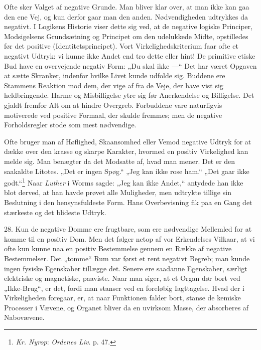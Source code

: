 \documentclass[12pt,a4paper]{book}
\newcommand{\apage}[1]{\marginnote{\footnotesize\textit{[#1]}}}
\begin{document}
Ofte sker Valget af negative Grunde. Man bliver klar over, at man ikke
kan gaa den ene Vej, og kun derfor gaar man den anden. Nødvendigheden
udtrykkes da negativt. I Logikens Historie viser dette sig ved, at de
negative logiske Principer, Modsigelsens Grundsætning og Principet om
den udelukkede Midte, opstilledes før det positive (Identitetsprincipet).
Vort Virkelighedskriterium faar ofte et negativt Udtryk: vi kunne ikke
Andet end tro dette eller hint! De primitive etiske Bud have en
overvejende negativ Form: „Du \apage{80} skal ikke ---“ Det har været Opgaven at
sætte Skranker, indenfor hvilke Livet kunde udfolde sig. Buddene ere
Stammens Reaktion mod dem, der vige af fra de Veje, der have vist sig
heldbringende. Harme og Misbilligelse ytre sig før Anerkendelse og
Billigelse. Det gjaldt fremfor Alt om at hindre Overgreb. Forbuddene
vare naturligvis motiverede ved positive Formaal, der skulde fremmes;
men de negative Forholdsregler stode som mest nødvendige.

Ofte bruger man af Høflighed, Skaansomhed eller Vemod negative Udtryk
for at dække over den krasse og skarpe Karakter, hvormed en positiv
Virkelighed kan melde sig. Man benægter da det Modsatte af, hvad man
mener. Det er den saakaldte Litotes. „Det er ingen Spøg.“ „Jeg kan ikke
rose ham.“ „Det gaar ikke godt.“\footnote{\emph{Kr. Nyrop}:
\emph{Ordenes Liv}. p. 47.} Naar \emph{Luther} i Worms sagde: „Jeg kan
ikke Andet,“ antydede han ikke blot derved, at han havde prøvet alle
Muligheder, men udtrykte tillige sin Beslutning i den hensynsfuldeste
Form. Hans Overbevisning fik paa en Gang det stærkeste og det blideste
Udtryk.

28. Kun de negative Domme ere frugtbare, som ere nødvendige Mellemled
for at komme til en positiv Dom. Men det følger netop af vor Erkendelses
Vilkaar, at vi ofte kun kunne naa en positiv Bestemmelse gennem en Række
af negative Bestemmelser. Det „tomme“ Rum var først et rent negativt
Begreb; man kunde ingen fysiske Egenskaber tillægge det. Senere ere
saadanne Egenskaber, særligt elektriske og magnetiske, paaviste. Naar
man siger, at et Organ dør bort ved „Ikke-Brug“, er det, fordi man
stanser ved en foreløbig Iagttagelse. Hvad der i Virkeligheden foregaar,
er, at naar Funktionen falder bort, stanse de kemiske Processer i
Vævene, og Organet bliver da en uvirksom Masse, der absorberes af
Nabovævene.
\end{document}
